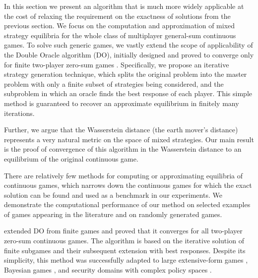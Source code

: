 In this section we present an algorithm that is much more widely applicable at the cost of relaxing the requirement on the exactness of solutions from the previous section. We focus on the computation and approximation of mixed strategy equilibria for the whole class of multiplayer general-sum continuous games. To solve such generic games, we vastly extend the scope of applicability of the Double Oracle algorithm (DO), initially designed and proved to converge only for finite two-player zero-sum games \cite{McMahan03}. Specifically, we propose an iterative strategy generation technique, which splits the original problem into the master problem with only a finite subset of strategies being considered, and the subproblem in which an oracle finds the best response of each player. This simple method is guaranteed to recover an approximate equilibrium in finitely many iterations.

Further, we argue that the Wasserstein distance (the earth mover's distance) represents a very natural metric on the space of mixed strategies. Our main result is the proof of convergence of this algorithm in the Wasserstein distance to an equilibrium of the original continuous game.

There are relatively few methods for computing or approximating equilibria of continuous games, which narrows down the continuous games for which the exact solution can be found and used as a benchmark in our experiments. We demonstrate the computational performance of our method on selected examples of games appearing in the literature and on randomly generated games.

\cite{adam.horčík.ea:double} extended DO from finite games and proved that it converges for all two-player zero-sum continuous games. The algorithm is based on the iterative solution of finite subgames and their subsequent extension with best responses. Despite its simplicity, this method was successfully adapted to large extensive-form games \cite{Bosansky14}, Bayesian games \cite{Li21}, and security domains with complex policy spaces \cite{Xu21}.